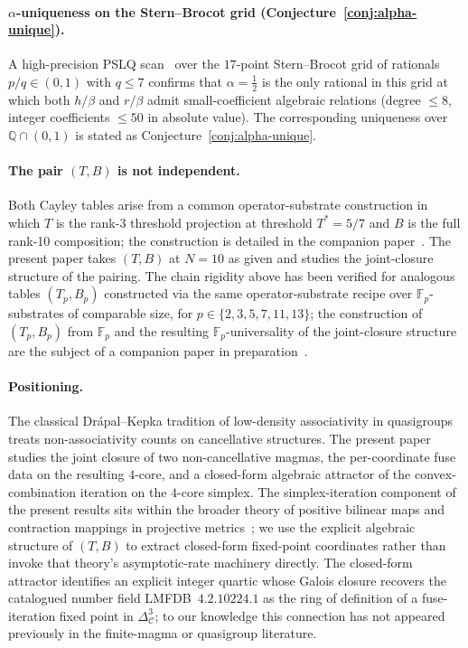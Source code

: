 \documentclass[11pt,reqno]{amsart}
\theoremstyle{plain}
\theoremstyle{definition}
\theoremstyle{remark}
\newcommand{\Q}{\mathbb{Q}}
\newcommand{\F}{\mathbb{F}}
\newcommand{\Cfour}{\mathcal{C}}
\begin{document}
\paragraph{$\alpha$-uniqueness on the Stern--Brocot grid
(Conjecture~\ref{conj:alpha-unique}).} A high-precision PSLQ
scan~\cite{FergusonBailey1999} over the $17$-point Stern--Brocot
grid of rationals $p/q\in(0,1)$ with $q\le 7$ confirms that
$\alpha=\tfrac12$ is the only rational in this grid at which both
$h/\beta$ and $r/\beta$ admit small-coefficient algebraic
relations (degree $\le 8$, integer coefficients $\le 50$ in
absolute value). The corresponding uniqueness over
$\Q\cap(0,1)$ is stated as Conjecture~\ref{conj:alpha-unique}.

\paragraph{The pair $(T,B)$ is not independent.} Both Cayley
tables arise from a common operator-substrate construction in
which $T$ is the rank-3 threshold projection at threshold
$T^{*} = 5/7$ and $B$ is the full rank-10 composition; the
construction is detailed in the companion
paper~\cite{SandersGish2026Sigma}. The present paper takes
$(T, B)$ at $N = 10$ as given and studies the joint-closure
structure of the pairing. The chain rigidity above has been
verified for analogous tables $(T_{p}, B_{p})$ constructed via
the same operator-substrate recipe over $\F_{p}$-substrates of
comparable size, for $p \in \{2, 3, 5, 7, 11, 13\}$; the
construction of $(T_{p}, B_{p})$ from $\F_{p}$ and the resulting
$\F_{p}$-universality of the joint-closure structure are the
subject of a companion paper in
preparation~\cite{SandersClaudeChat2026BridgeSprint}.

\paragraph{Positioning.} The classical Drápal--Kepka tradition
of low-density associativity in
quasigroups~\cite{Kepka1980, DrapalKepka1985, DrapalWanless2021}
treats non-associativity counts on cancellative structures. The
present paper studies the joint closure of two non-cancellative
magmas, the per-coordinate fuse data on the resulting $4$-core,
and a closed-form algebraic attractor of the convex-combination
iteration on the $4$-core simplex. The simplex-iteration
component of the present results sits within the broader theory
of positive bilinear maps and contraction mappings in projective
metrics~\cite{Birkhoff1957, Bushell1973}; we use the explicit
algebraic structure of $(T, B)$ to extract closed-form
fixed-point coordinates rather than invoke that theory's
asymptotic-rate machinery directly. The closed-form attractor
identifies an explicit integer quartic whose Galois closure
recovers the catalogued number field LMFDB~$4.2.10224.1$ as the
ring of definition of a fuse-iteration fixed point in
$\Delta^{3}_{\Cfour}$; to our knowledge this connection has not
appeared previously in the finite-magma or quasigroup literature.
\end{document}
